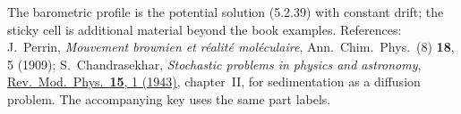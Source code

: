 \documentclass[11pt]{article}
\begin{document}
\vfill

{\footnotesize The barometric profile is the potential solution (5.2.39) with constant drift; the sticky cell is
additional material beyond the book examples. References: J.~Perrin, \emph{Mouvement brownien et r\'ealit\'e
mol\'eculaire}, Ann.\ Chim.\ Phys.\ (8) \textbf{18}, 5 (1909); S.~Chandrasekhar, \emph{Stochastic problems in
physics and astronomy}, \href{https://doi.org/10.1103/RevModPhys.15.1}{Rev.\ Mod.\ Phys.\ \textbf{15}, 1 (1943)},
chapter~II, for sedimentation as a diffusion problem. The accompanying key uses the same part labels.\par}
\end{document}
